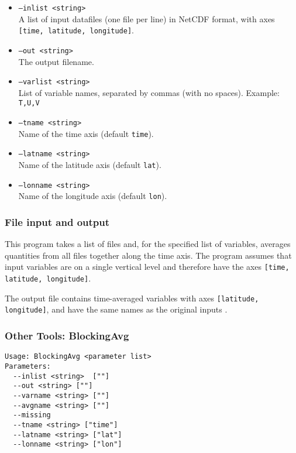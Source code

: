 \documentclass{article}
\begin{document}
\begin{itemize}
\item[]\texttt{--inlist <string>} \\ A list of input datafiles (one file per line) in NetCDF format, with axes \texttt{[time, latitude, longitude]}. 
\item[] \texttt{--out <string>}\\ The output filename.
\item[] \texttt{--varlist <string>}\\ List of variable names, separated by commas (with no spaces). Example: \texttt{T,U,V}
\item[] \texttt{--tname <string>}\\Name of the time axis (default \texttt{time}).
\item[]\texttt{--latname <string>}\\Name of the latitude axis (default \texttt{lat}).
\item[]\texttt{--lonname <string>}\\Name of the longitude axis (default \texttt{lon}).
\end{itemize}

\subsubsection{File input and output}
This program takes a list of files and, for the specified list of variables, averages quantities from all files together along the time axis. The program assumes that input variables are on a single vertical level and therefore have the axes \texttt{[time, latitude, longitude]}. 

The output file contains time-averaged variables  with axes \texttt{[latitude, longitude]}, and have the same names as the original inputs . 



\subsubsection{Other Tools: BlockingAvg}\label{bavg}
\begin{verbatim}
Usage: BlockingAvg <parameter list>
Parameters:
  --inlist <string>  [""]
  --out <string> [""]
  --varname <string> [""]
  --avgname <string> [""]
  --missing
  --tname <string> ["time"]
  --latname <string> ["lat"]
  --lonname <string> ["lon"]
\end{verbatim}
\end{document}
